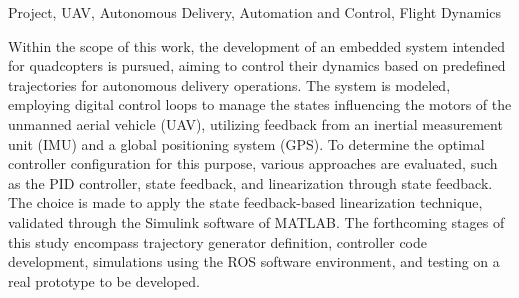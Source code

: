 \documentclass[repeatfields,xlists,xpacks,oneside,yearsonly]{ufrgscca}
\begin{document}
\begin{abstract}

No âmbito deste trabalho, busca-se o desenvolvimento de um sistema embarcado destinado a quadricópteros, visando controlar sua dinâmica com base em trajetórias predefinidas para operações autônomas de entrega. O sistema é modelado, empregando-se malhas de controle digital para gerenciar os estados que influenciam os motores da aeronave não tripulada (UAV, \textit{unmanned aerial vehicle}), utilizando o \textit{feedback} proveniente de uma unidade de medição inercial (IMU, \textit{inertial measurement unit}) e um sistema de posicionamento global (GPS, \textit{global positioning system}). Para determinar a configuração ideal do controlador para essa finalidade, são avaliadas distintas abordagens, como o controlador PID, realimentação de estados e linearização via realimentação de estados. Opta-se pela aplicação da técnica de linearização via realimentação de estados, validada por meio do \textit{software} Simulink do MATLAB. As próximas etapas desse estudo envolvem a definição do gerador de trajetória, a elaboração do código do controlador, simulações utilizando o ambiente de \textit{software} ROS e a realização de testes em um protótipo real a ser desenvolvido.

\end{abstract}

\begin{otherabstract}{Project, UAV, Autonomous Delivery, Automation and Control, Flight Dynamics}

Within the scope of this work, the development of an embedded system intended for quadcopters is pursued, aiming to control their dynamics based on predefined trajectories for autonomous delivery operations. The system is modeled, employing digital control loops to manage the states influencing the motors of the unmanned aerial vehicle (UAV), utilizing feedback from an inertial measurement unit (IMU) and a global positioning system (GPS). To determine the optimal controller configuration for this purpose, various approaches are evaluated, such as the PID controller, state feedback, and linearization through state feedback. The choice is made to apply the state feedback-based linearization technique, validated through the Simulink software of MATLAB. The forthcoming stages of this study encompass trajectory generator definition, controller code development, simulations using the ROS software environment, and testing on a real prototype to be developed.
\end{otherabstract}
\end{document}
